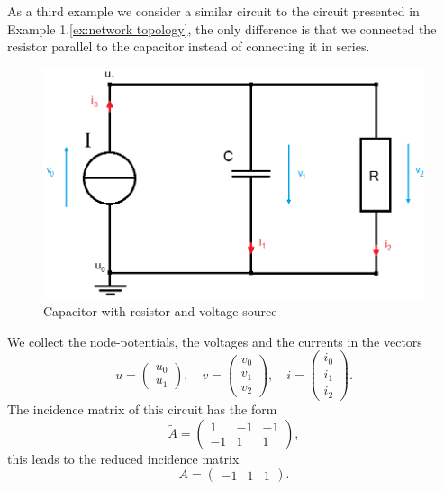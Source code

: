\begin{example3}
	\label{ex:Example 3 - incidence matrix }
	As a third example we consider a similar circuit to the circuit presented in Example 1.\ref{ex:network topology}, the only difference is that we connected the resistor parallel to the capacitor instead of connecting it in series.
	\begin{figure}[H]
		\label{circuit:Example 3}
		\centering
		\includegraphics[scale=0.5]{pictures/Example3.png}
		\caption{Capacitor with resistor and voltage source}
	\end{figure}
	
	We collect the node-potentials, the voltages and the currents in the vectors
	\begin{displaymath}
		u=
		\left(
		\begin{matrix}
			u_0 \\
			u_1 
		\end{matrix}
		\right),
		\quad
		v=
		\left(
		\begin{matrix}
			v_0 \\
			v_1 \\
			v_2 
		\end{matrix}
		\right),
		\quad
		i=
		\left(
		\begin{matrix}
			i_0 \\
			i_1 \\
			i_2 
		\end{matrix}
		\right).
	\end{displaymath}
	The incidence matrix of this circuit has the form
		\begin{displaymath}
		\tilde{A} = 
		\left(
		\begin{matrix}
			1 & -1 & -1 \\
			-1 & 1 & 1 
		\end{matrix}
		\right),
	\end{displaymath}
	this leads to the reduced incidence matrix
	\begin{displaymath}
		A = 
		\left(
		\begin{matrix}
			-1 & 1 & 1
		\end{matrix}
		\right).
	\end{displaymath}
\end{example3}


